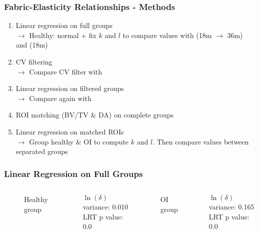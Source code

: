 \documentclass[xcolor=table]{beamer}
\renewcommand{\arraystretch}{2}
\begin{document}
\begin{frame}
	\frametitle{Fabric-Elasticity Relationships - Methods}
	\begin{enumerate}
		\item Linear regression on full groups\\
				$\rightarrow$ Healthy: normal + fix $k$ and $l$ to compare values with \cite{p11} (18\si{\micro}m $\rightarrow$ 36\si{\micro}m) and \cite{p12} (18\si{\micro}m)
		\item CV filtering\\
				$\rightarrow$ Compare CV filter with \cite{p11}
		\item Linear regression on filtered groups\\
				$\rightarrow$ Compare again with \cite{p11}
		\item ROI matching (BV/TV \& DA) on complete groups
		\item Linear regression on matched ROIs\\
				$\rightarrow$ Group healthy \& OI to compute $k$ and $l$. Then compare values between separated groups
	\end{enumerate}
\end{frame}


\begin{frame}
	\frametitle{Linear Regression on Full Groups}
	\begin{columns}
		\centering
		\begin{figure}
			\caption{Healthy group}
		\end{figure}
		\vspace{-0.5cm}
		$\ln(\delta)$ variance: 0.010\\
		LRT p value: 0.0
		\centering
		\begin{figure}
			\caption{OI group}
		\end{figure}
		\vspace{-0.5cm}
		$\ln(\delta)$ variance: 0.165\\
		LRT p value: 0.0
	\end{columns}
\end{frame}


\renewcommand{\arraystretch}{1.5}
\end{document}
